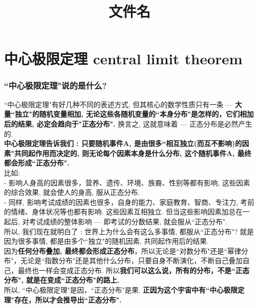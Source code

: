 \documentclass[UTF8]{ctexart}
\title{文件名}
\begin{document}
	\tableofcontents %
	\date{} %
	\maketitle  %
	
		
	\part{中心极限定理 central limit theorem}
		
		
	\section{``中心极限定理"说的是什么?}
	``中心极限定理"有好几种不同的表述方式, 但其核心的数学性质只有一条 ---  \textbf{大量``独立"的随机变量相加, 无论这些各随机变量的``本身分布"是怎样的，它们相加后的结果, 必定会趋向于"正态分布".} 换言之, 这就意味着 --- 正态分布是必然产生的. \\
	
	\textbf{中心极限定理告诉我们 : 只要随机事件A, 是由很多``相互独立(而互不影响)的因素"共同起作用而决定的, 则无论每个因素本身是什么分布, 这个随机事件A, 最终都会形成``正态分布".} \\
	
	比如: \\
	- 影响人身高的因素很多，营养、遗传、环境、族裔、性别等都有影响, 这些因素的综合效果, 就会使人的身高, 服从正态分布. \\
	- 同样, 影响考试成绩的因素也很多，自身的能力、家庭教育、智商、专注力, 考前的情绪、身体状况等也都有影响. 这些因素互相独立. 但当这些影响因素加总在一起后, 对考试成绩的整体影响 --- 即考试的分数结果, 就会服从``正态分布". \\
	
	所以, 我们现在就明白了 : 世界上为什么会有这么多事情, 都服从``正态分布"? 就是因为很多事情, 都是由多个``独立"的随机因素, 共同起作用后的结果. \\
	
	因为\textbf{任何分布叠加, 最终都会形成正态分布}，所以无论是``对数分布"还是``幂律分布"，无论是``指数分布"还是其他什么分布，只要自身不断演化，不断自己叠加自己，最终也一样会变成正态分布. 所以\textbf{我们可以这么说，所有的分布，不是``正态分布", 就是在变成``正态分布"的路上.} \\	
	所以, ``中心极限定理"是因，``正态分布"是果. \textbf{正因为这个宇宙中有``中心极限定理"存在，所以才会推导出``正态分布".} \\
	
\end{document}
